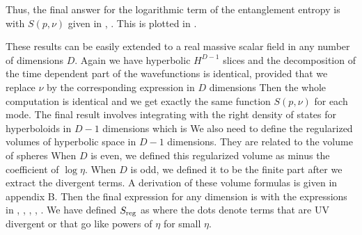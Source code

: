 \ifig{} {}

Thus, the final answer for the logarithmic term of the entanglement entropy is
\eqn{}
with $S(p,\nu)$ given in \entmode , \eigen . This is plotted in \entrfree .


These results can be easily extended to a real massive scalar field in any number of dimensions $D$. Again we
have hyperbolic $H^{D-1}$ slices and the decomposition of the time dependent part of the
wavefunctions is identical, provided that we replace $\nu$ by the corresponding expression in $D$
dimensions
\eqn{}
Then the whole computation is identical and we get exactly the same function $S(p,\nu)$ for each mode.
The final result involves integrating with the right density of states for hyperboloids in $D-1$
 dimensions which is \BytsenkoBC
\eqn{}
We also need to define the regularized volumes of hyperbolic space in $D-1$ dimensions. They
are related to the volume of spheres
\eqn{}
When $D$ is even, we defined this regularized volume as minus the coefficient of $\log\eta$. When
$D$ is odd, we defined it to be the finite part after we extract the divergent terms. A derivation of these volume formulas is given in appendix B.
Then the final expression for any dimension is
\eqn{}
with the expressions in \volregd , \denst , \entmode , \eigen , \nud .
We have defined  $S_{\rm reg}$   as
\eqn{}
where the dots denote terms that are UV divergent or that go like powers of $\eta$ for small $\eta$.

